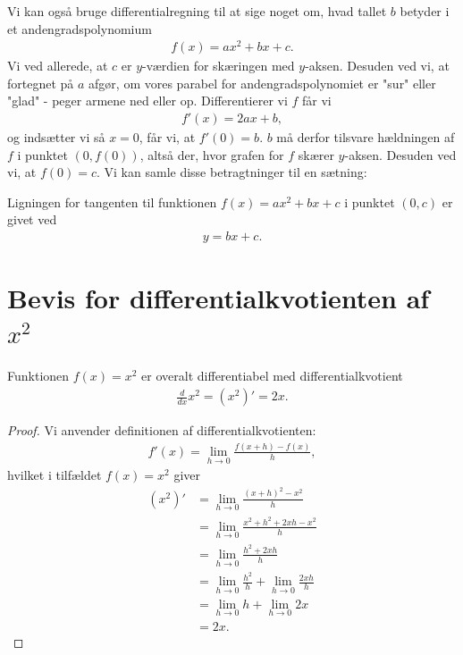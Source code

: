 Vi kan også bruge differentialregning til at sige noget om, hvad tallet $b$ betyder i et andengradspolynomium
\begin{align*}
f(x) = ax^2+bx+c.
\end{align*}
Vi ved allerede, at $c$ er $y$-værdien for skæringen med $y$-aksen. Desuden ved vi, at fortegnet på $a$ afgør, om vores parabel for andengradspolynomiet er "sur" eller "glad" - peger armene ned eller op. Differentierer vi $f$ får vi
\begin{align*}
f'(x) = 2ax+b,
\end{align*}
og indsætter vi så $x = 0$, får vi, at $f'(0) = b$. $b$ må derfor tilsvare hældningen af $f$ i punktet $(0,f(0))$, altså der, hvor grafen for $f$ skærer $y$-aksen. Desuden ved vi, at $f(0) = c$. Vi kan samle disse betragtninger til en sætning:
\begin{setn}
Ligningen for tangenten til funktionen $f(x) = ax^2+bx+c$ i punktet $(0,c)$ er givet ved
\begin{align*}
y = bx+c.
\end{align*}
\end{setn}

\section*{Bevis for differentialkvotienten af $x^2$}
\begin{setn}
Funktionen $f(x)=x^2$ er overalt differentiabel med differentialkvotient
\begin{align*}
\frac{d}{dx}x^2 = (x^2)' = 2x. 
\end{align*}
\end{setn}
\begin{proof}
Vi anvender definitionen af differentialkvotienten:
\begin{align*}
f'(x) = \lim_{h\to 0}\frac{f(x+h)-f(x)}{h},
\end{align*}
hvilket i tilfældet $f(x) = x^2$ giver
\begin{align*}
(x^2)' &= \lim_{h\to 0}\frac{(x+h)^2-x^2}{h}\\
&= \lim_{h\to 0} \frac{x^2+h^2+2xh-x^2}{h}\\
&= \lim_{h\to 0} \frac{h^2+2xh}{h}\\
&= \lim_{h\to 0} \frac{h^2}{h} + \lim_{h\to 0} \frac{2xh}{h}\\
&= \lim_{h\to 0} h + \lim_{h\to 0} 2x\\
&= 2x.
\end{align*}
\end{proof}

